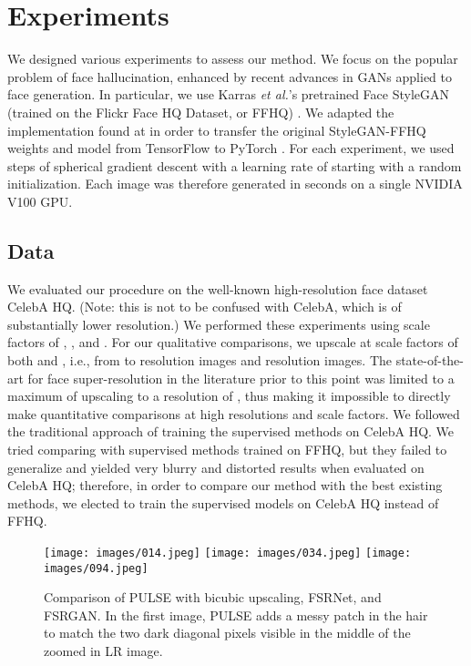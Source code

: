 \documentclass[10pt,twocolumn,letterpaper]{article}
\begin{document}
\section{Experiments}

We designed various experiments to assess our method. We focus on the popular problem of face hallucination, enhanced by recent advances in GANs applied to face generation. In particular, we use Karras \textit{et al.}'s pretrained Face StyleGAN (trained on the Flickr Face HQ Dataset, or FFHQ) \cite{karras2019style}. We adapted the implementation found at \cite{PyTorchStyleGAN} in order to transfer the original StyleGAN-FFHQ weights and model from TensorFlow \cite{abadi2016tensorflow} to PyTorch \cite{paszke2019pytorch}. For each experiment, we used  steps of spherical gradient descent with a learning rate of  starting with a random initialization. Each image was therefore generated in  seconds on a single NVIDIA V100 GPU. 

\subsection{Data}
We evaluated our procedure on the well-known high-resolution face dataset CelebA HQ. (Note: this is not to be confused with CelebA, which is of substantially lower resolution.) We performed these experiments using scale factors of , , and .
For our qualitative comparisons, we upscale at scale factors of both  and , i.e., from  to  resolution images and  resolution images. The state-of-the-art for face super-resolution in the literature prior to this point was limited to a maximum of  upscaling to a resolution of , thus making it impossible to directly make quantitative comparisons at high resolutions and scale factors. We followed the traditional approach of training the supervised methods on CelebA HQ. We tried comparing with supervised methods trained on FFHQ, but they failed to generalize and yielded very blurry and distorted results when evaluated on CelebA HQ; therefore, in order to compare our method with the best existing methods, we elected to train the supervised models on CelebA HQ instead of FFHQ. 

\begin{figure*}[!ht]
    \centering
    \texttt{[image: images/014.jpeg]}
    \texttt{[image: images/034.jpeg]}
    \texttt{[image: images/094.jpeg]}
\caption{Comparison of PULSE with bicubic upscaling, FSRNet, and FSRGAN. In the first image, PULSE adds a messy patch in the hair to match the two dark diagonal pixels visible in the middle of the zoomed in LR image.}
    \label{fig:algcomparison}
\end{figure*}
\end{document}
